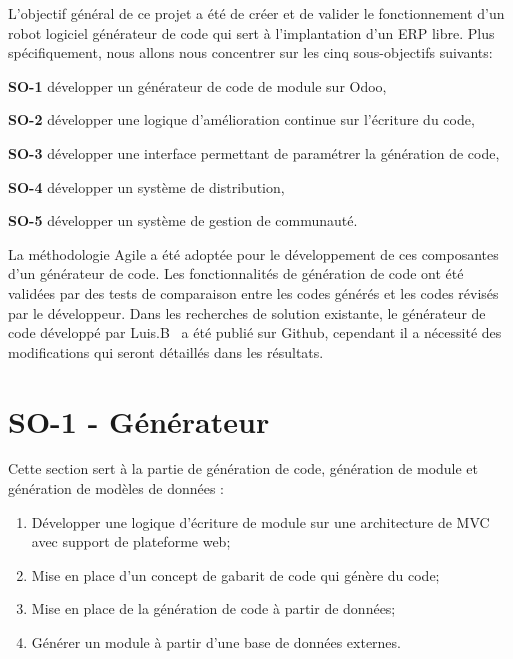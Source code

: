 \label{sec:Theme1} \label{chapitre_methode}

L’objectif général de ce projet a été de créer et de valider le fonctionnement d’un robot logiciel générateur de code qui sert à l’implantation d’un ERP libre. Plus spécifiquement, nous allons nous concentrer sur les cinq sous-objectifs suivants:

\textbf{SO-1} développer un générateur de code de module sur Odoo,

\textbf{SO-2} développer une logique d'amélioration continue sur l'écriture du code,

\textbf{SO-3} développer une interface permettant de paramétrer la génération de code,

\textbf{SO-4} développer un système de distribution,

\textbf{SO-5} développer un système de gestion de communauté.

La méthodologie Agile a été adoptée pour le développement de ces composantes d'un générateur de code. Les fonctionnalités de génération de code ont été validées par des tests de comparaison entre les codes générés et les codes révisés par le développeur. Dans les recherches de solution existante, le générateur de code développé par Luis.B~\cite{bluiksnot_repo} a été publié sur Github, cependant il a nécessité des modifications qui seront détaillés dans les résultats.


\section{SO-1 - Générateur}
Cette section sert à la partie de génération de code, génération de module et génération de modèles de données :
\begin{enumerate}
    \item Développer une logique d’écriture de module sur une architecture de MVC avec support de plateforme web;
    \item Mise en place d’un concept de gabarit de code qui génère du code;
    \item Mise en place de la génération de code à partir de données;
    \item Générer un module à partir d’une base de données externes.
\end{enumerate}

